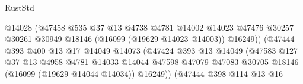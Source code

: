 \begin{lexlean}{RustStd}
\begin{coremodule}
                                              @14028
                                              (@47458
                                                @535
                                                @37
                                                @13
                                                @4738
                                                @4781
                                                @14002
                                                @14023
                                                @47476
                                                @30257
                                                @30261
                                                @30949
                                                @18146
                                                (@16099 (@19629 @14023 @14003))
                                                @16249))
                                            (@47444
                                              @393
                                              @400
                                              @13
                                              @17
                                              @14049
                                              @14073
                                              (@47424
                                                @393
                                                @13
                                                @14049
                                                (@47583
                                                  @127
                                                  @37
                                                  @13
                                                  @4958
                                                  @4781
                                                  @14033
                                                  @14044
                                                  @47598
                                                  @47079
                                                  @47083
                                                  @30705
                                                  @18146
                                                  (@16099 (@19629 @14044 @14034))
                                                  @16249))
                                              (@47444
                                                @398
                                                @114
                                                @13
                                                @16

\end{coremodule}
\end{lexlean}
